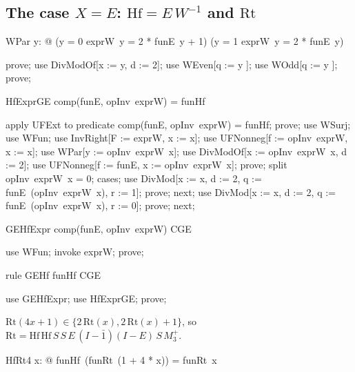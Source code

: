 \documentclass{article}
\begin{document}
\subsection{The case $X = E$: $\mathrm{Hf} = E\,W^{-1}$ and $\mathrm{Rt}$}

\begin{theorem}{WPar}
  \forall y: \nat @ (y  = 0 \implies exprW~y = 2 * funE~y + 1) \land (y  = 1 \implies exprW~y = 2 * funE~y)
\end{theorem}

\begin{zproof}
prove;
use DivModOf[x := y, d := 2];
use WEven[q := y ];
use WOdd[q := y ];
prove;
\end{zproof}

\begin{theorem}{HfExprGE}
  comp(funE, opInv~exprW) = funHf
\end{theorem}

\begin{zproof}
apply UFExt to predicate comp(funE, opInv~exprW) = funHf;
prove;
use WSurj;
use WFun;
use InvRight[F := exprW, x := x];
use UFNonneg[f := opInv~exprW, x := x];
use WPar[y := opInv~exprW~x];
use DivModOf[x := opInv~exprW~x, d := 2];
use UFNonneg[f := funE, x := opInv~exprW~x];
prove;
split opInv~exprW~x  = 0;
cases;
use DivMod[x := x, d := 2, q := funE~(opInv~exprW~x), r := 1];
prove;
next;
use DivMod[x := x, d := 2, q := funE~(opInv~exprW~x), r := 0];
prove;
next;
\end{zproof}

\begin{theorem}{GEHfExpr}
  comp(funE, opInv~exprW) \in CGE
\end{theorem}

\begin{zproof}
use WFun;
invoke exprW;
prove;
\end{zproof}

\begin{theorem}{rule GEHf}
  funHf \in CGE
\end{theorem}

\begin{zproof}
use GEHfExpr;
use HfExprGE;
prove;
\end{zproof}


$\mathrm{Rt}(4x + 1) \in \{2\,\mathrm{Rt}(x), 2\,\mathrm{Rt}(x) + 1\}$, so
$\mathrm{Rt} = \mathrm{Hf}\,\mathrm{Hf}\,S\,S\,E\,(I - \bar 1)(I - E)\,S\,M_3^+$.

\begin{theorem}{HfRt4}
  \forall x: \nat @ funHf~(funRt~(1 + 4 * x)) = funRt~x
\end{theorem}
\end{document}
